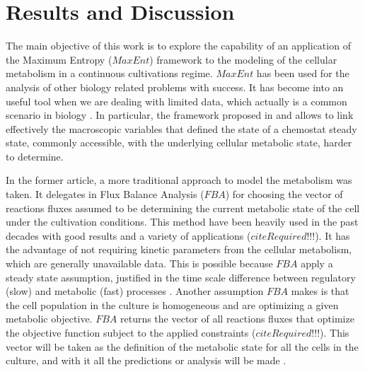 \documentclass[]{article}
\begin{document}
	
	
	
	
	
	
	
	
	\section{Results and Discussion} 
	
	The main objective of this work is to explore the capability of an application of the Maximum Entropy ($MaxEnt$) framework to the modeling of the cellular metabolism in a continuous cultivations regime. $MaxEnt$ has been used for the analysis of other biology related problems with success. It has become into an useful tool when we are dealing with limited data, which actually is a common scenario in biology . In particular, the framework proposed in  and  allows to link effectively the macroscopic variables that defined the state of a chemostat steady state, commonly accessible, with the underlying cellular metabolic state, harder to determine. 
	
	In the former article, a more traditional approach to model the metabolism was taken. It delegates in Flux Balance Analysis ($FBA$)  for choosing the vector of reactions fluxes assumed to be determining the current metabolic state of the cell under the cultivation conditions. This method have been heavily used in the past decades with good results and a variety of applications ($citeRequired!!!$). 
	It has the advantage of not requiring kinetic parameters from the cellular metabolism, which are generally unavailable data.
	This is possible because $FBA$ apply a steady state assumption, justified in the time scale difference between regulatory (slow) and metabolic (fast) processes . 
	Another assumption $FBA$ makes is that the cell population in the culture is homogeneous and are optimizing a given metabolic objective. 
	$FBA$ returns the vector of all reactions fluxes that optimize the objective function subject to the applied constraints ($citeRequired!!!$). 
	This vector will be taken as the definition of the metabolic state for all the cells in the culture, and with it all the predictions or analysis will be made . 
	
\end{document}
